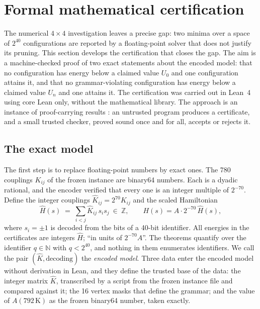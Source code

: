 \documentclass[11pt,a4paper]{article}
\theoremstyle{plain}
\theoremstyle{definition}
\theoremstyle{remark}
\begin{document}
\section{Formal mathematical certification}\label{sec:formal}

The numerical $4\times4$ investigation leaves a precise gap: two minima over a space of $2^{40}$ configurations are reported by a floating-point solver that does not justify its pruning. This section develops the certification that closes the gap. The aim is a machine-checked proof of two exact statements about the encoded model: that no configuration has energy below a claimed value $U_0$ and one configuration attains it, and that no grammar-violating configuration has energy below a claimed value $U_n$ and one attains it. The certification was carried out in Lean~4 \cite{deMoura2021} using core Lean only, without the mathematical library. The approach is an instance of proof-carrying results \cite{Necula1997}: an untrusted program produces a certificate, and a small trusted checker, proved sound once and for all, accepts or rejects it.

\subsection{The exact model}\label{sec:exactmodel}
The first step is to replace floating-point numbers by exact ones. The 780 couplings $K_{ij}$ of the frozen instance are binary64 numbers. Each is a dyadic rational, and the encoder verified that every one is an integer multiple of $2^{-70}$. Define the integer couplings $\hat K_{ij}=2^{70}K_{ij}$ and the scaled Hamiltonian
\[
\hat H(s)\;=\;\sum_{i<j}\hat K_{ij}\,s_is_j\ \in\ \mathbb Z,\qquad H(s)=A\cdot 2^{-70}\,\hat H(s),
\]
where $s_i=\pm1$ is decoded from the bits of a 40-bit identifier. All energies in the certificates are integers $\hat H$; ``in units of $2^{-70}A$''. The theorems quantify over the identifier $q\in\mathbb N$ with $q<2^{40}$, and nothing in them enumerates identifiers. We call the pair $(\hat K,\text{decoding})$ the \emph{encoded model}. Three data enter the encoded model without derivation in Lean, and they define the trusted base of the data: the integer matrix $\hat K$, transcribed by a script from the frozen instance file and compared against it; the 16 vertex masks that define the grammar; and the value of $A(792\,\mathrm K)$ as the frozen binary64 number, taken exactly.
\end{document}
